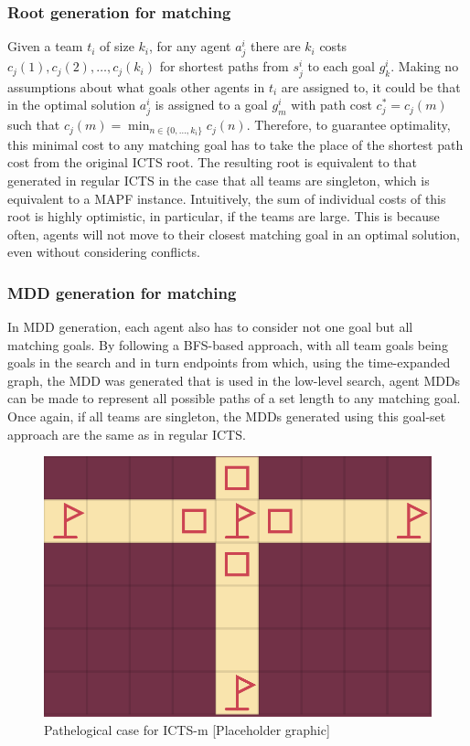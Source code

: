 \documentclass[english]{article}
\begin{document}
	\subsubsection{Root generation for matching}
	Given a team $t_i$ of size $k_i$, for any agent $a_j^i$ there are $k_i$ costs $c_j(1),c_j(2),\ldots,c_j(k_i)$ for shortest paths from $s_j^i$ to each goal $g_k^i$. Making no assumptions about what goals other agents in $t_i$ are assigned to, it could be that in the optimal solution $a_j^i$ is assigned to a goal $g_{m}^i$ with path cost $c^*_j = c_j(m)$ such that $c_j(m) = \min_{n\in\{0,\ldots,k_i\}} c_j(n)$. Therefore, to guarantee optimality, this minimal cost to any matching goal has to take the place of the shortest path cost from the original ICTS root. The resulting root is equivalent to that generated in regular ICTS in the case that all teams are singleton, which is equivalent to a MAPF instance. Intuitively, the sum of individual costs of this root is highly optimistic, in particular, if the teams are large. This is because often, agents will not move to their closest matching goal in an optimal solution, even without considering conflicts.
	
	\subsubsection{MDD generation for matching}
	In MDD generation, each agent also has to consider not one goal but all matching goals. By following a BFS-based approach, with all team goals being goals in the search and in turn endpoints from which, using the time-expanded graph, the MDD was generated that is used in the low-level search, agent MDDs can be made to represent all possible paths of a set length to any matching goal. Once again, if all teams are singleton, the MDDs generated using this goal-set approach are the same as in regular ICTS.
	\begin{figure}
		\centering
		\includegraphics[width=\linewidth]{img/path}
		\caption{Pathelogical case for ICTS-m [Placeholder graphic]}
		\label{fig:path}
	\end{figure}
\end{document}
